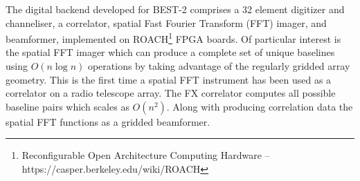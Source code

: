 \documentclass[useAMS,macros,usenatbib]{mn2e}
\begin{document}
The digital backend developed for BEST-2 comprises a 32 element digitizer and channeliser, a correlator, spatial Fast Fourier Transform (FFT) imager, and beamformer, implemented on ROACH\footnote{Reconfigurable Open Architecture Computing Hardware -- https://casper.berkeley.edu/wiki/ROACH} FPGA boards.
Of particular interest is the spatial FFT imager which can produce a complete set of unique baselines using $O(n \log n)$ operations by taking advantage of the regularly gridded array geometry.
This is the first time a spatial FFT instrument has been used as a correlator on a radio telescope array.
The FX correlator computes all possible baseline pairs which scales as $O(n^2)$.
Along with producing correlation data the spatial FFT functions as a gridded beamformer.
\end{document}
